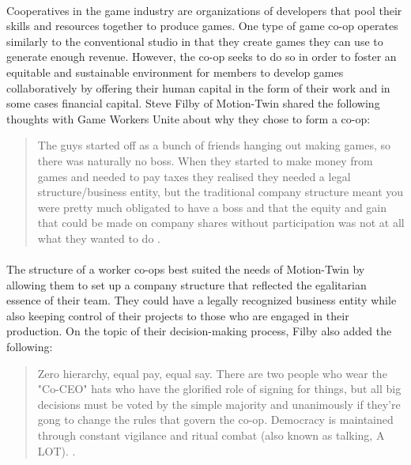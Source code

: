 \paragraph{} Cooperatives in the game industry are organizations of developers that pool their skills and resources together to produce games. One type of game co-op operates similarly to the conventional studio in that they create games they can use to generate enough revenue. However, the co-op seeks to do so in order to foster an equitable and sustainable environment for members to develop games collaboratively by offering their human capital in the form of their work and in some cases financial capital. Steve Filby of Motion-Twin shared the following thoughts with Game Workers Unite about why they chose to form a co-op:

\begin{quote}
    \item{} The guys started off as a bunch of friends hanging out making games, so there was naturally no boss. When they started to make money from games and needed to pay taxes they realised they needed a legal structure/business entity, but the traditional company structure meant you were pretty much obligated to have a boss and that the equity and gain that could be made on company shares without participation was not at all what they wanted to do \autocite{game_workers_unite_worker_2021}.
\end{quote}

\paragraph{} The structure of a worker co-ops best suited the needs of Motion-Twin by allowing them to set up a company structure that reflected the egalitarian essence of their team. They could have a legally recognized business entity while also keeping control of their projects to those who are engaged in their production. On the topic of their decision-making process, Filby also added the following:

\begin{quote}
    \item{} Zero hierarchy, equal pay, equal say. There are two people who wear the "Co-CEO" hats who have the glorified role of signing for things, but all big decisions must be voted by the simple majority and unanimously if they're gong to change the rules that govern the co-op. Democracy is maintained through constant vigilance and ritual combat (also known as talking, A LOT). \autocite{game_workers_unite_worker_2021}.
\end{quote}


